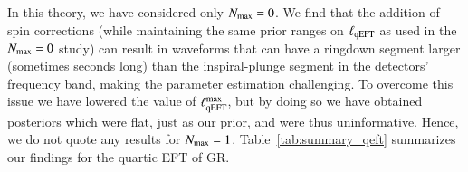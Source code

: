 \documentclass[twocolumn,
               prd,
               aps,
               superscriptaddress,
               tightenlines,
               nofootinbib,
               eqsecnum,
               amsfonts,
               amsmath,
               longbibliography]{revtex4-1}
\newcommand{\gm}{\mathfrak{m}}
\newcommand{\hscomm}[1]{{\textcolor{TealBlue}{{[HS: #1]}}}}
\newcommand{\abcomm}[1]{{\textcolor{red}{{[AB: #1]}}}}
\begin{document}
In this theory, we have considered only $N_{\rm max} = 0$.
%
We find that the addition of spin corrections (while maintaining the same prior
ranges on $\ell_{\rm qEFT}$ as used in the $N_{\rm max} = 0$ study) can result
in waveforms that can have a ringdown segment larger (sometimes seconds long)
than the inspiral-plunge segment in the detectors' frequency band, making the
parameter estimation challenging.
%
To overcome this issue we have lowered the value of $\ell^{\rm max}_{\rm qEFT}$, but by doing so we have obtained posteriors
which were flat, just as our prior, and were thus uninformative. Hence, we do not quote any results for $N_{\rm max} = 1$.
%
Table~\ref{tab:summary_qeft} summarizes our findings for the quartic EFT of GR.
%
\end{document}
